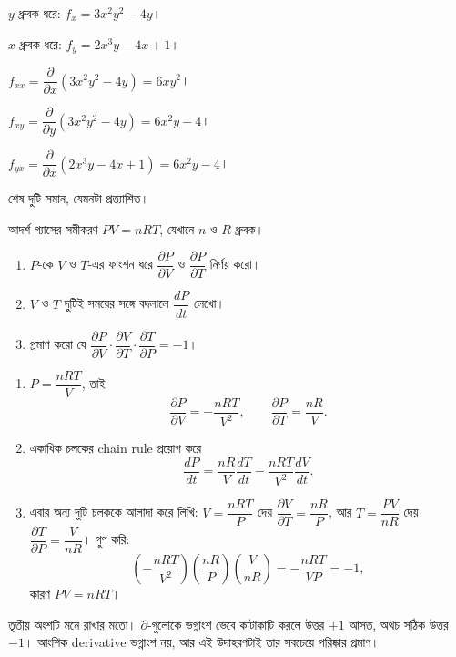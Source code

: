 \documentclass[11pt]{article}
\begin{document}
\begin{sol}
$y$ ধ্রুবক ধরে: $f_{x} = 3x^{2}y^{2} - 4y$।

$x$ ধ্রুবক ধরে: $f_{y} = 2x^{3}y - 4x + 1$।

$f_{xx} = \dfrac{\partial}{\partial x}\left( 3x^{2}y^{2}-4y \right) = 6xy^{2}$।

$f_{xy} = \dfrac{\partial}{\partial y}\left( 3x^{2}y^{2}-4y \right)
= 6x^{2}y - 4$।

$f_{yx} = \dfrac{\partial}{\partial x}\left( 2x^{3}y - 4x + 1 \right)
= 6x^{2}y - 4$।

শেষ দুটি সমান, যেমনটা প্রত্যাশিত।
\end{sol}

 আদর্শ গ্যাসের সমীকরণ $PV = nRT$, যেখানে $n$ ও $R$ ধ্রুবক।
\begin{enumerate}
  \item $P$-কে $V$ ও $T$-এর ফাংশন ধরে $\dfrac{\partial P}{\partial V}$ ও
        $\dfrac{\partial P}{\partial T}$ নির্ণয় করো।
  \item $V$ ও $T$ দুটিই সময়ের সঙ্গে বদলালে $\dfrac{dP}{dt}$ লেখো।
  \item প্রমাণ করো যে
        $\dfrac{\partial P}{\partial V} \cdot
         \dfrac{\partial V}{\partial T} \cdot
         \dfrac{\partial T}{\partial P} = -1$।
\end{enumerate}

\begin{sol}
\begin{enumerate}
  \item $P = \dfrac{nRT}{V}$, তাই
        \[
          \frac{\partial P}{\partial V} = -\frac{nRT}{V^{2}}, \qquad
          \frac{\partial P}{\partial T} = \frac{nR}{V} .
        \]
  \item একাধিক চলকের chain rule প্রয়োগ করে
        \[
          \frac{dP}{dt} = \frac{nR}{V}\frac{dT}{dt}
                        - \frac{nRT}{V^{2}}\frac{dV}{dt} .
        \]
  \item এবার অন্য দুটি চলককে আলাদা করে লিখি:
        $V = \dfrac{nRT}{P}$ দেয় $\dfrac{\partial V}{\partial T} =
        \dfrac{nR}{P}$, আর $T = \dfrac{PV}{nR}$ দেয়
        $\dfrac{\partial T}{\partial P} = \dfrac{V}{nR}$। গুণ করি:
        \[
          \left( -\frac{nRT}{V^{2}} \right)
          \left( \frac{nR}{P} \right)
          \left( \frac{V}{nR} \right)
          = -\frac{nRT}{VP} = -1 ,
        \]
        কারণ $PV = nRT$।
\end{enumerate}
তৃতীয় অংশটি মনে রাখার মতো। $\partial$-গুলোকে ভগ্নাংশ ভেবে কাটাকাটি করলে
উত্তর $+1$ আসত, অথচ সঠিক উত্তর $-1$। আংশিক derivative ভগ্নাংশ নয়, আর এই
উদাহরণটাই তার সবচেয়ে পরিষ্কার প্রমাণ।
\end{sol}
\end{document}
